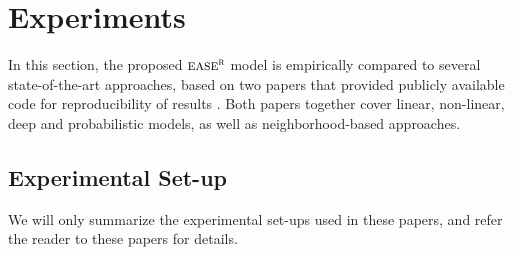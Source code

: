 \documentclass[sigconf]{acmart}
\newcommand{\sae}{${\textsc{ease}}^{\textsc{r}}$}
\begin{document}
\section{Experiments}
\label{sec_exp}
In this section, the proposed \sae{}  model is empirically compared to several state-of-the-art approaches, based on two papers that provided publicly available code for reproducibility of results \cite{liang18,volkovs15}. Both papers together cover linear, non-linear, deep and probabilistic models, as well as neighborhood-based approaches.
\subsection{Experimental Set-up}
We will only summarize the experimental set-ups used in these papers, and refer the reader to these papers for  details.
\end{document}
